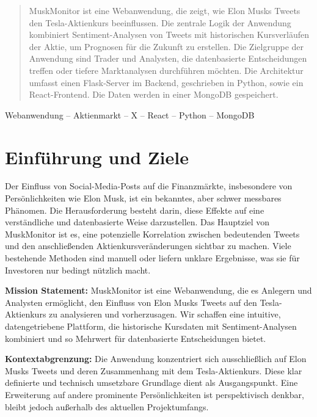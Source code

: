 \documentclass[conference,a4paper,flushend]{cs-techrep}
\begin{document}
\selectlanguage{\cstechrepLang}

\maketitle

\begin{abstract}
MuskMonitor ist eine Webanwendung, die zeigt, wie Elon Musks Tweets den Tesla-Aktienkurs beeinflussen. Die zentrale Logik der Anwendung kombiniert Sentiment-Analysen von Tweets mit historischen Kursverläufen der Aktie, um Prognosen für die Zukunft zu erstellen. Die Zielgruppe der Anwendung sind Trader und Analysten, die datenbasierte Entscheidungen treffen oder tiefere Marktanalysen durchführen möchten. Die Architektur umfasst einen Flask-Server im Backend, geschrieben in Python, sowie ein React-Frontend. Die Daten werden in einer MongoDB gespeichert.
\end{abstract}

\begin{IEEEkeywords}
Webanwendung – Aktienmarkt – X – React – Python – MongoDB
\end{IEEEkeywords}

\section{Einführung und Ziele}

Der Einfluss von Social-Media-Posts auf die Finanzmärkte, insbesondere von Persönlichkeiten wie Elon Musk, ist ein bekanntes, aber schwer messbares Phänomen. Die Herausforderung besteht darin, diese Effekte auf eine verständliche und datenbasierte Weise darzustellen. Das Hauptziel von MuskMonitor ist es, eine potenzielle Korrelation zwischen bedeutenden Tweets und den anschließenden Aktienkursveränderungen sichtbar zu machen. Viele bestehende Methoden sind manuell oder liefern unklare Ergebnisse, was sie für Investoren nur bedingt nützlich macht.

\textbf{Mission Statement: }
MuskMonitor ist eine Webanwendung, die es Anlegern und Analysten ermöglicht, den Einfluss von Elon Musks Tweets auf den Tesla-Aktienkurs zu analysieren und vorherzusagen. Wir schaffen eine intuitive, datengetriebene Plattform, die historische Kursdaten mit Sentiment-Analysen kombiniert und so Mehrwert für datenbasierte Entscheidungen bietet.

\textbf{Kontextabgrenzung: }  
Die Anwendung konzentriert sich ausschließlich auf Elon Musks Tweets und deren Zusammenhang mit dem Tesla-Aktienkurs. Diese klar definierte und technisch umsetzbare Grundlage dient als Ausgangspunkt. Eine Erweiterung auf andere prominente Persönlichkeiten ist perspektivisch denkbar, bleibt jedoch außerhalb des aktuellen Projektumfangs.
\end{document}
